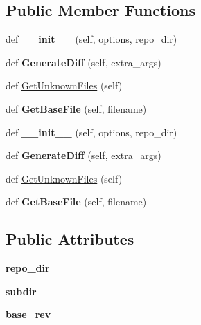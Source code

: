 \subsection*{Public Member Functions}
\begin{DoxyCompactItemize}
\item 
\mbox{\label{classupload_1_1_mercurial_v_c_s_a33890f442dedbb7d9fd45c08b5baed56}} 
def {\bfseries \+\_\+\+\_\+init\+\_\+\+\_\+} (self, options, repo\+\_\+dir)
\item 
\mbox{\label{classupload_1_1_mercurial_v_c_s_a6c05746012d8cd435c94ace1465671ef}} 
def {\bfseries Generate\+Diff} (self, extra\+\_\+args)
\item 
def \hyperlink{classupload_1_1_mercurial_v_c_s_a6190899fb86cd09ad84cc5d4b0ebd2f3}{Get\+Unknown\+Files} (self)
\item 
\mbox{\label{classupload_1_1_mercurial_v_c_s_a0cdc0cbe6ac4daab82f5f01e6ae2e670}} 
def {\bfseries Get\+Base\+File} (self, filename)
\item 
\mbox{\label{classupload_1_1_mercurial_v_c_s_a33890f442dedbb7d9fd45c08b5baed56}} 
def {\bfseries \+\_\+\+\_\+init\+\_\+\+\_\+} (self, options, repo\+\_\+dir)
\item 
\mbox{\label{classupload_1_1_mercurial_v_c_s_a6c05746012d8cd435c94ace1465671ef}} 
def {\bfseries Generate\+Diff} (self, extra\+\_\+args)
\item 
def \hyperlink{classupload_1_1_mercurial_v_c_s_a6190899fb86cd09ad84cc5d4b0ebd2f3}{Get\+Unknown\+Files} (self)
\item 
\mbox{\label{classupload_1_1_mercurial_v_c_s_a0cdc0cbe6ac4daab82f5f01e6ae2e670}} 
def {\bfseries Get\+Base\+File} (self, filename)
\end{DoxyCompactItemize}
\subsection*{Public Attributes}
\begin{DoxyCompactItemize}
\item 
\mbox{\label{classupload_1_1_mercurial_v_c_s_a219c1e0ab9ce864e3231913762ea489b}} 
{\bfseries repo\+\_\+dir}
\item 
\mbox{\label{classupload_1_1_mercurial_v_c_s_a0dad32e621f5523e3430d867184f0b42}} 
{\bfseries subdir}
\item 
\mbox{\label{classupload_1_1_mercurial_v_c_s_a41faae7820d5a015f4a42476e5e4ab8c}} 
{\bfseries base\+\_\+rev}
\end{DoxyCompactItemize}


